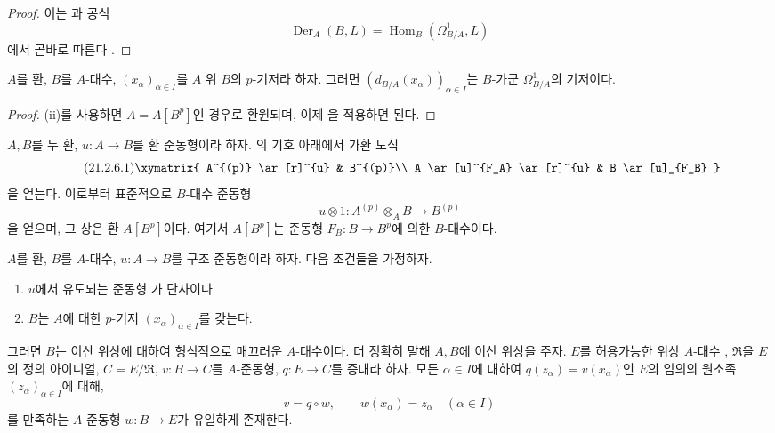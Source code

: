 \begin{proof}
이는 과 공식
\[
  \operatorname{Der}_A(B,L)
  =\operatorname{Hom}_B(\Omega^1_{B/A},L)
\]
에서 곧바로 따른다 .
\end{proof}

\begin{corollary}[21.2.5]
\label{0.21.2.5-ko}
$A$를 환, $B$를 $A$-대수, $(x_\alpha)_{\alpha\in I}$를 $A$ 위
$B$의 $p$-기저라 하자. 그러면
$(d_{B/A}(x_\alpha))_{\alpha\in I}$는 $B$-가군
$\Omega^1_{B/A}$의 기저이다.
\end{corollary}

\begin{proof}
(ii)를 사용하면 $A=A[B^p]$인 경우로 환원되며,
이제 을 적용하면 된다.
\end{proof}

\begin{env}[21.2.6]
\label{0.21.2.6-ko}
$A,B$를 두 환, $u:A\to B$를 환 준동형이라 하자.
의 기호 아래에서 가환 도식
\begin{equation}
\tag{21.2.6.1}
\label{0.21.2.6.1-ko}
\xymatrix{
 A^{(p)} \ar[r]^{u} & B^{(p)}\\
 A \ar[u]^{F_A} \ar[r]^{u} & B \ar[u]_{F_B}
}
\end{equation}
을 얻는다. 이로부터 표준적으로 $B$-대수 준동형
\begin{equation}
\tag{21.2.6.2}
\label{0.21.2.6.2-ko}
u\otimes1:A^{(p)}\otimes_A B\longrightarrow B^{(p)}
\end{equation}
을 얻으며, 그 상은 환 $A[B^p]$이다. 여기서 $A[B^p]$는 준동형
$F_B:B\to B^p$에 의한 $B$-대수이다.
\end{env}

\begin{theorem}[21.2.7]
\label{0.21.2.7-ko}
$A$를 환, $B$를 $A$-대수, $u:A\to B$를 구조 준동형이라 하자.
다음 조건들을 가정하자.
\begin{enumerate}
  \item[(i)] $u$에서 유도되는 준동형 가
  단사이다.
  \item[(ii)] $B$는 $A$에 대한 $p$-기저
  $(x_\alpha)_{\alpha\in I}$를 갖는다.
\end{enumerate}
그러면 $B$는 이산 위상에 대하여 형식적으로 매끄러운 $A$-대수이다.
더 정확히 말해 $A,B$에 이산 위상을 주자. $E$를 허용가능한 위상
$A$-대수 , $\mathfrak R$을 $E$의 정의 아이디얼,
$C=E/\mathfrak R$, $v:B\to C$를 $A$-준동형,
$q:E\to C$를 증대라 하자. 모든 $\alpha\in I$에 대하여
$q(z_\alpha)=v(x_\alpha)$인 $E$의 임의의 원소족
$(z_\alpha)_{\alpha\in I}$에 대해,
\[
  v=q\circ w,\qquad w(x_\alpha)=z_\alpha\quad(\alpha\in I)
\]
를 만족하는 $A$-준동형 $w:B\to E$가 유일하게 존재한다.
\end{theorem}

